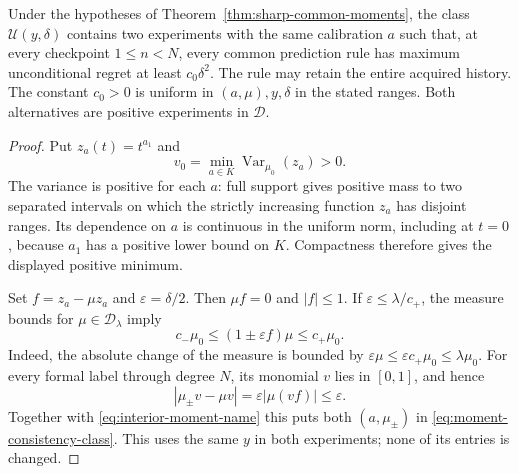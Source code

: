 \begin{lemma}
\label{lem:uniform-collision-ambiguity}
Under the hypotheses of Theorem~\ref{thm:sharp-common-moments}, the
class $\mathcal U(y,\delta)$ contains two experiments with the same
calibration $a$ such that, at every checkpoint $1\le n<N$, every
common prediction rule has maximum unconditional regret at least
$c_0\delta^2$. The rule may retain the entire acquired history.
The constant $c_0>0$ is uniform in $(a,\mu),y,\delta$ in the stated
ranges. Both alternatives are positive experiments in $\mathcal D$.
\end{lemma}
\begin{proof}
Put $z_a(t)=t^{a_1}$ and
\[
 v_0=\min_{a\in K}\operatorname{Var}_{\mu_0}(z_a)>0.
\]
The variance is positive for each $a$: full support gives positive mass
to two separated intervals on which the strictly increasing function
$z_a$ has disjoint ranges. Its dependence on $a$ is continuous in the
uniform norm, including at $t=0$, because $a_1$ has a positive lower
bound on $K$. Compactness therefore gives the displayed positive minimum.

Set $f=z_a-\mu z_a$ and $\varepsilon=\delta/2$. Then $\mu f=0$
and $|f|\le1$. If $\varepsilon\le\lambda/c_+$, the measure bounds
for $\mu\in\mathcal D_\lambda$ imply
\[
 c_-\mu_0\le(1\pm\varepsilon f)\mu\le c_+\mu_0.
\]
Indeed, the absolute change of the measure is bounded by
$\varepsilon\mu\le\varepsilon c_+\mu_0\le\lambda\mu_0$.
For every formal label through degree $N$, its monomial $v$ lies in
$[0,1]$, and hence
\[
 |\mu_\pm v-\mu v|=\varepsilon|\mu(vf)|\le\varepsilon.
\]
Together with \eqref{eq:interior-moment-name} this puts both
$(a,\mu_\pm)$ in \eqref{eq:moment-consistency-class}. This uses the
same $y$ in both experiments; none of its entries is changed.


\end{proof}
